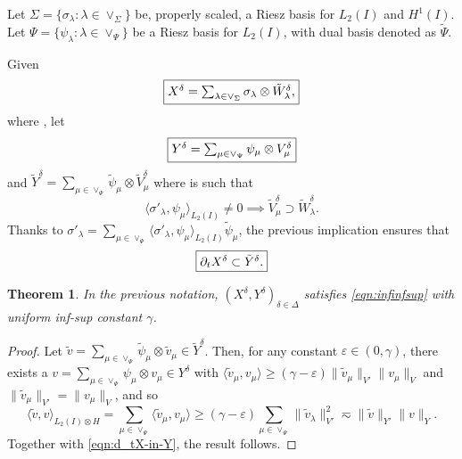 \documentclass[11pt,a4paper,oneside,english]{amsart}
\numberwithin{equation}{section}
\newtheorem{theorem}{Theorem}
\numberwithin{theorem}{section}
\theoremstyle{definition}
\newcommand{\eps}{\varepsilon}
\newcommand{\la}{\langle}
\newcommand{\ra}{\rangle}
\newcommand{\jw}[1]{{\color{red}{JW: #1}}}
\newcommand{\rvv}[1]{{\color{teal}{RvV: #1}}}
\begin{document}
Let $\Sigma=\{\sigma_\lambda : \lambda \in \vee_\Sigma\}$ be, properly scaled, a Riesz basis for $L_2(I)$ and $H^1(I)$.\rvv{Definitie maken ergens?}
Let $\Psi=\{\psi_\lambda \colon \lambda \in \vee_\Psi\}$ be a Riesz basis for $L_2(I)$, with dual basis denoted as $\tilde{\Psi}$.

Given
\[
\framebox{$X^\delta=\sum_{\lambda \in \vee_\Sigma} \sigma_\lambda \otimes \tilde{W}_\lambda^\delta,$}
\]
where , let
\[
\framebox{$Y^\delta=\sum_{\mu \in \vee_\Psi} \psi_\mu \otimes V_\mu^\delta$}
\]
and $\tilde{Y}^\delta=\sum_{\mu \in \vee_\Psi} \tilde{\psi}_\mu \otimes \tilde{V}_\mu^\delta$
where  is such that
\begin{equation}
  \label{eqn:pre-doubletree}
  \la \sigma'_\lambda,\psi_\mu\ra_{L_2(I)} \neq 0 \implies \tilde{V}^\delta_\mu \supset \tilde{W}^\delta_\lambda.
\end{equation}
\jw{hoe werkt deze eis precies?}
Thanks to $\sigma'_\lambda=\sum_{\mu \in \vee_\Psi} \la \sigma'_\lambda,\psi_\mu\ra_{L_2(I)}\tilde{\psi}_\mu$, the previous implication ensures that
\begin{equation}
  \label{eqn:d_tX-in-Y}
 \framebox{$\partial_t X^\delta \subset \tilde{Y}^\delta.$}
\end{equation}
\rvv{deze uitlijning is slecht}
\begin{theorem}
In the previous notation, $(X^\delta,Y^\delta)_{\delta \in \Delta}$ satisfies
  \eqref{eqn:infinfsup} with uniform inf-sup constant $\gamma$.
\end{theorem}
\begin{proof}
  \jw{Ik ben dit nog niet nagegaan.}
Let $\tilde v=\sum_{\mu \in \vee_\Psi} \tilde{\psi}_\mu \otimes \tilde{v}_\mu \in \tilde{Y}^\delta$.
Then, for any constant $\eps\in (0,\gamma)$, there exists a $v=\sum_{\mu \in \vee_\Psi} \psi_\mu \otimes v_\mu \in Y^\delta$  with $\la \tilde v_\mu,v_\mu\ra \geq (\gamma-\eps) \|\tilde{v}_\mu\|_{V'} \|v_\mu\|_V$ and $\|\tilde{v}_\mu\|_{V'}= \|v_\mu\|_V$, and so
\[
  \la\tilde v, v\ra_{L_2(I)\otimes H}
  = \sum_{\mu \in \vee_\Psi} \la \tilde{v}_\mu,v_\mu\ra \geq (\gamma-\eps)
  \sum_{\mu \in \vee_\Psi} \|\tilde{v}_\lambda\|_{V'}^2
  \eqsim \|\tilde v\|_{Y'} \|v\|_Y.
\]
  Together with \eqref{eqn:d_tX-in-Y}, the result follows.
\end{proof}
\end{document}
